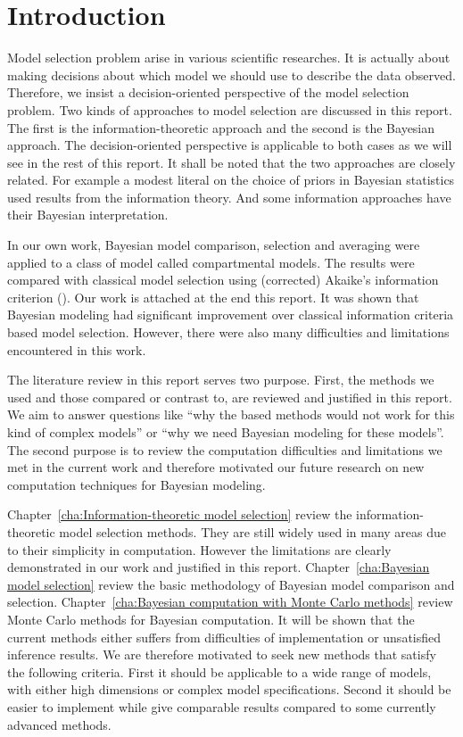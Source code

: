 \chapter{Introduction}
\label{cha:Introduction}

Model selection problem arise in various scientific researches. It is actually
about making decisions about which model we should use to describe the data
observed. Therefore, we insist a decision-oriented perspective of the model
selection problem. Two kinds of approaches to model selection are discussed in
this report. The first is the information-theoretic approach and the second is
the Bayesian approach. The decision-oriented perspective is applicable to both
cases as we will see in the rest of this report. It shall be noted that the
two approaches are closely related. For example a modest literal on the choice
of priors in Bayesian statistics used results from the information theory. And
some information approaches have their Bayesian interpretation.

In our own work, Bayesian model comparison, selection and averaging were
applied to a class of model called compartmental models. The results were
compared with classical model selection using (corrected) Akaike's information
criterion (\aicc). Our work is attached at the end this report. It was shown
that Bayesian modeling had significant improvement over classical information
criteria based model selection. However, there were also many difficulties and
limitations encountered in this work.

The literature review in this report serves two purpose. First, the methods we
used and those compared or contrast to, are reviewed and justified in this
report. We aim to answer questions like ``why the \aic based methods would not
work for this kind of complex models'' or ``why we need Bayesian modeling for
these models''. The second purpose is to review the computation difficulties
and limitations we met in the current work and therefore motivated our future
research on new computation techniques for Bayesian modeling.

Chapter~\ref{cha:Information-theoretic model selection} review the
information-theoretic model selection methods. They are still widely used in
many areas due to their simplicity in computation. However the limitations are
clearly demonstrated in our work and justified in this report.
Chapter~\ref{cha:Bayesian model selection} review the basic methodology of
Bayesian model comparison and selection. Chapter~\ref{cha:Bayesian computation
  with Monte Carlo methods} review Monte Carlo methods for Bayesian
computation. It will be shown that the current methods either suffers from
difficulties of implementation or unsatisfied inference results. We are
therefore motivated to seek new methods that satisfy the following criteria.
First it should be applicable to a wide range of models, with either high
dimensions or complex model specifications. Second it should be easier to
implement while give comparable results compared to some currently advanced
methods.
